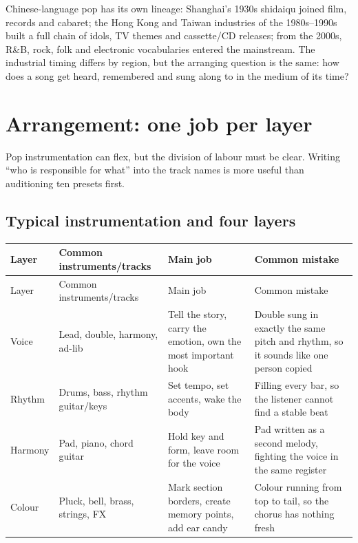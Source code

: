 Chinese-language pop has its own lineage: Shanghai's 1930s shidaiqu joined film, records and cabaret; the Hong Kong and Taiwan industries of the 1980s--1990s built a full chain of idols, TV themes and cassette/CD releases; from the 2000s, R\&B, rock, folk and electronic vocabularies entered the mainstream. The industrial timing differs by region, but the arranging question is the same: how does a song get heard, remembered and sung along to in the medium of its time?

\section{Arrangement: one job per layer}
\label{sec:pop-craft}

Pop instrumentation can flex, but the division of labour must be clear. Writing ``who is responsible for what'' into the track names is more useful than auditioning ten presets first.

\subsection{Typical instrumentation and four layers}
\label{sec:pop-instrumentation}

\begin{longtable}{p{}p{}p{}p{}}
\toprule
Layer & Common instruments/tracks & Main job & Common mistake \\
\midrule
\endfirsthead
\toprule
Layer & Common instruments/tracks & Main job & Common mistake \\
\midrule
\endhead
Voice & Lead, double, harmony, ad-lib & Tell the story, carry the emotion, own the most important hook & Double sung in exactly the same pitch and rhythm, so it sounds like one person copied \\
Rhythm & Drums, bass, rhythm guitar/keys & Set tempo, set accents, wake the body & Filling every bar, so the listener cannot find a stable beat \\
Harmony & Pad, piano, chord guitar & Hold key and form, leave room for the voice & Pad written as a second melody, fighting the voice in the same register \\
Colour & Pluck, bell, brass, strings, FX & Mark section borders, create memory points, add ear candy & Colour running from top to tail, so the chorus has nothing fresh \\
\bottomrule
\end{longtable}

